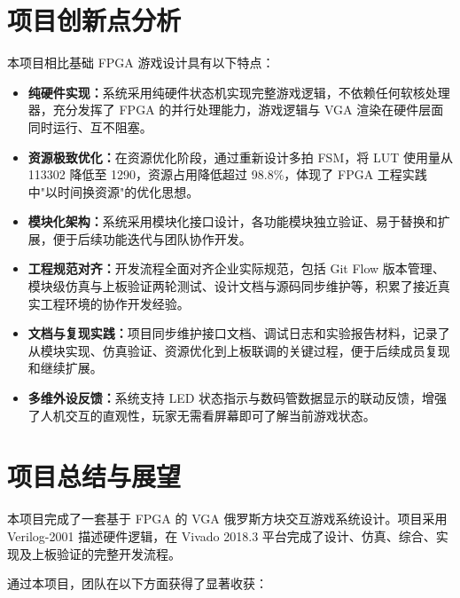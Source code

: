 \documentclass[UTF8,zihao=-4]{ctexart}
\begin{document}
\section{项目创新点分析}

本项目相比基础 FPGA 游戏设计具有以下特点：

\begin{itemize}
    \item \textbf{纯硬件实现：}系统采用纯硬件状态机实现完整游戏逻辑，不依赖任何软核处理器，充分发挥了 FPGA 的并行处理能力，游戏逻辑与 VGA 渲染在硬件层面同时运行、互不阻塞。

    \item \textbf{资源极致优化：}在资源优化阶段，通过重新设计多拍 FSM，将 LUT 使用量从 113302 降低至 1290，资源占用降低超过 98.8\%，体现了 FPGA 工程实践中"以时间换资源"的优化思想。

    \item \textbf{模块化架构：}系统采用模块化接口设计，各功能模块独立验证、易于替换和扩展，便于后续功能迭代与团队协作开发。

    \item \textbf{工程规范对齐：}开发流程全面对齐企业实际规范，包括 Git Flow 版本管理、模块级仿真与上板验证两轮测试、设计文档与源码同步维护等，积累了接近真实工程环境的协作开发经验。

    \item \textbf{文档与复现实践：}项目同步维护接口文档、调试日志和实验报告材料，记录了从模块实现、仿真验证、资源优化到上板联调的关键过程，便于后续成员复现和继续扩展。

    \item \textbf{多维外设反馈：}系统支持 LED 状态指示与数码管数据显示的联动反馈，增强了人机交互的直观性，玩家无需看屏幕即可了解当前游戏状态。
\end{itemize}

\section{项目总结与展望}

本项目完成了一套基于 FPGA 的 VGA 俄罗斯方块交互游戏系统设计。项目采用 Verilog-2001 描述硬件逻辑，在 Vivado 2018.3 平台完成了设计、仿真、综合、实现及上板验证的完整开发流程。

通过本项目，团队在以下方面获得了显著收获：
\end{document}
